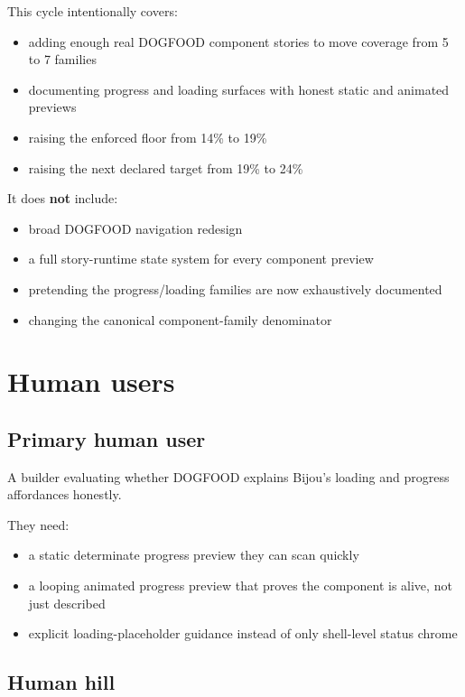 This cycle intentionally covers:

\begin{itemize}
\tightlist
\item
  adding enough real DOGFOOD component stories to move coverage from 5 to 7 families
\item
  documenting progress and loading surfaces with honest static and animated previews
\item
  raising the enforced floor from 14\% to 19\%
\item
  raising the next declared target from 19\% to 24\%
\end{itemize}

It does \textbf{not} include:

\begin{itemize}
\tightlist
\item
  broad DOGFOOD navigation redesign
\item
  a full story-runtime state system for every component preview
\item
  pretending the progress/loading families are now exhaustively documented
\item
  changing the canonical component-family denominator
\end{itemize}

\section{Human users}\label{record-067-human-users}

\subsection{Primary human user}\label{record-067-primary-human-user}

A builder evaluating whether DOGFOOD explains Bijou's loading and progress affordances honestly.

They need:

\begin{itemize}
\tightlist
\item
  a static determinate progress preview they can scan quickly
\item
  a looping animated progress preview that proves the component is alive, not just described
\item
  explicit loading-placeholder guidance instead of only shell-level status chrome
\end{itemize}

\subsection{Human hill}\label{record-067-human-hill}

